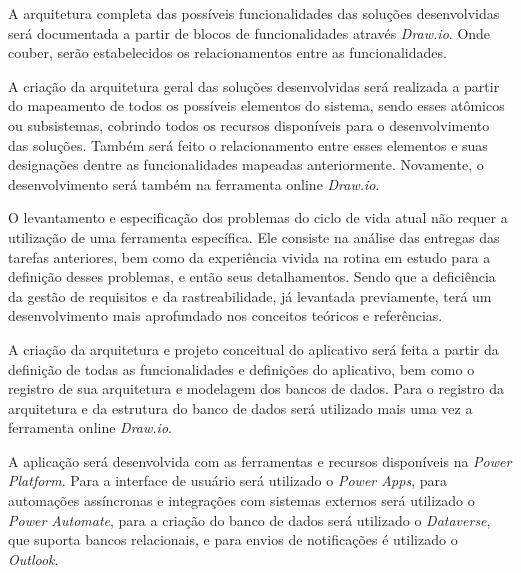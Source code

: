 	A arquitetura completa das possíveis funcionalidades das soluções desenvolvidas será documentada a partir de blocos de funcionalidades através \textit{Draw.io}. Onde couber, serão estabelecidos os relacionamentos entre as funcionalidades.

	A criação da arquitetura geral das soluções desenvolvidas será realizada a partir do mapeamento de todos os possíveis elementos do sistema, sendo esses atômicos ou 
	subsistemas, cobrindo todos os recursos disponíveis para o 
	desenvolvimento das soluções. Também será feito o relacionamento entre 
	esses elementos e suas designações dentre as funcionalidades mapeadas 
	anteriormente. Novamente, o desenvolvimento será também na ferramenta 
	online \textit{Draw.io}.

	O levantamento e especificação dos problemas do ciclo de vida atual não requer a utilização de uma ferramenta específica. Ele consiste na análise das entregas das tarefas anteriores, bem como da experiência vivida na rotina em estudo para a definição desses problemas, e então seus detalhamentos. Sendo que a deficiência da gestão de requisitos e da rastreabilidade, já levantada previamente, terá um desenvolvimento mais aprofundado nos conceitos teóricos e referências.

	A criação da arquitetura e projeto conceitual do aplicativo será feita a partir da definição de todas as funcionalidades e definições do aplicativo, bem como o registro de sua arquitetura e modelagem dos bancos de dados. Para o registro da arquitetura e da estrutura do banco de dados será utilizado mais uma vez a ferramenta online \textit{Draw.io}.

	A aplicação será desenvolvida com as ferramentas e recursos disponíveis na \textit{Power Platform}. Para a interface de usuário será utilizado o \textit{Power Apps}, para automações assíncronas e integrações com sistemas externos será utilizado o \textit{Power Automate}, para a criação do banco de dados será utilizado o \textit{Dataverse}, que suporta bancos relacionais, e para envios de notificações é utilizado o \textit{Outlook}.

	